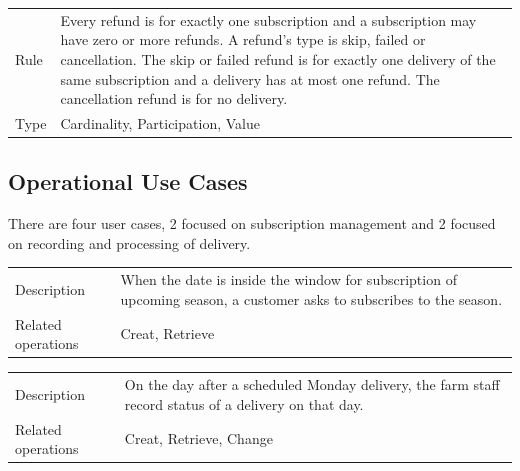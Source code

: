\begin{xltabular}{\linewidth}{@{}KY@{}}
Rule        & Every refund is for exactly one subscription and a subscription may have zero or more refunds. A refund's type is skip, failed or cancellation. The skip or failed refund is for exactly one delivery of the same subscription and a delivery has at most one refund. The cancellation refund is for no delivery. \\
Type        & Cardinality, Participation, Value\\
\bottomrule
\end{xltabular}

\subsection{Operational Use Cases}
\label{sec:usecases}
There are four user cases, 2 focused on subscription management and 2 focused on recording and processing of delivery.
\begin{xltabular}{\linewidth}{@{}KY@{}}
Description           & When the date is inside the window for subscription of upcoming season, a customer asks to subscribes to the season. \\
Related operations  & Creat, Retrieve \\
\bottomrule
\end{xltabular}

\begin{xltabular}{\linewidth}{@{}KY@{}}
Description           & On the day after a scheduled Monday delivery, the farm staff record status of a delivery on that day. \\
Related operations  & Creat, Retrieve, Change\\
\bottomrule
\end{xltabular}


